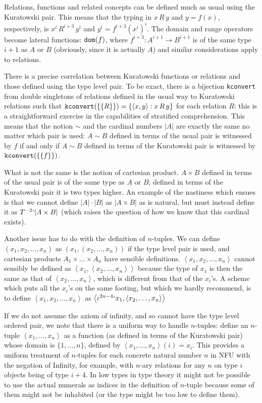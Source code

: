 \documentclass[12pt]{article}
\begin{document}
Relations, functions and related concepts can be defined much as usual using the Kuratowski pair.  This means that the typing in $x \, R \, y$ and $y = f(x)$, respectively, is $x^i\,R^{i+3}\,y^i$ and $y^i = f^{i+3}(x^i)^i$.  The domain and range operators become lateral functions:  ${\tt dom}(f)$, where $f^{i+3}:A^{i+1} \rightarrow B^{i+1}$ is of the same type $i+1$ as $A$ or $B$ (obviously, since it is actually $A$) and similar considerations apply to relations.

There is a precise correlation between Kuratowski functions or relations and those defined using the type level pair.  To be exact, there is a bijection {\tt kconvert} from double singletons of relations defined in the usual way  to Kuratowski relations such that ${\tt kconvert}(\{\{R\}\}) = \{\left<x,y\right>:x \, R\, y\}$ for each relation $R$:  this is a straightforward exercise in the capabilities of stratified comprehension.  This means that the notion $\sim$ and the cardinal numbers $|A|$ are exactly the same no matter which pair is used:  $A \sim B$ defined in terms of the usual pair is witnessed by $f$ if and only if $A \sim B$ defined in terms of the Kuratowski pair is witnessed by ${\tt kconvert}(\{\{f\}\})$.

What is not the same is the notion of cartesian product.  $A \times B$ defined in terms of the usual pair is of the same type as $A$ or $B$;  defined in terms of the Kuratowski pair it is two types higher.
An example of the nastiness which ensues is that we cannot define $|A| \cdot |B|$ as $|A \times B|$ as is natural, but must instead define it as $T^{-2}`|A \times B|$ (which raises the question of how we know that this cardinal exists).

Another issue has to do with the definition of $n$-tuples.  We can define $(x_1,x_2,\ldots,x_n)$ as $(x_1,(x_2,\ldots,x_n))$ if the type level pair is used, and cartesian products $A_1 \times \ldots \times A_n$ have sensible definitions.  $\left<x_1,x_2,\ldots,x_n\right>$ cannot sensibly be defined as $\left<x_1,\left<x_2,\ldots,x_n\right>\right>$  because the type of $x_1$ is then the same as that of $\left<x_2,\ldots,x_n\right>$,
which is different from that of the $x_i$'s.  A scheme which puts all the $x_i$'s on the same footing, but which we hardly recommend, is to define $\left<x_1,x_2,\ldots,x_n\right>$ as $\left<\iota^{2n-4}`x_1,\left<x_2,\ldots,x_n\right>\right>$

If we do not assume the axiom of infinity, and so cannot have the type level ordered pair, we note that there is a uniform way to handle $n$-tuples:  define an $n$-tuple $\left<x_1,\ldots,x_n\right>$ as a function
(as defined in terms of the Kuratowski pair) whose domain is $\{1,\ldots,n\}$, defined by $\left<x_1,\ldots,x_n\right>(i) = x_i$.  This provides a uniform treatment of $n$-tuples for each concrete natural number $n$ in NFU with the negation of Infinity, for example, with $n$-ary relations for any $n$ on type $i$ objects being of type $i+4$.  In low types in type theory it might not be possible to use the actual numerals as indices in the definition of $n$-tuple because some of them might not be inhabited (or the type might be too low to define them).
\end{document}
